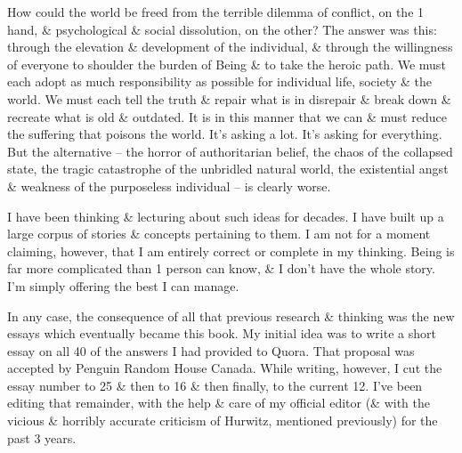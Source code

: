 \documentclass[oneside]{book}
\numberwithin{equation}{section}
\begin{document}
How could the world be freed from the terrible dilemma of conflict, on the 1 hand, \& psychological \& social dissolution, on the other? The answer was this: through the elevation \& development of the individual, \& through the willingness of everyone to shoulder the burden of Being \& to take the heroic path. We must each adopt as much responsibility as possible for individual life, society \& the world. We must each tell the truth \& repair what is in disrepair \& break down \& recreate what is old \& outdated. It is in this manner that we can \& must reduce the suffering that poisons the world. It's asking a lot. It's asking for everything. But the alternative -- the horror of authoritarian belief, the chaos of the collapsed state, the tragic catastrophe of the unbridled natural world, the existential angst \& weakness of the purposeless individual -- is clearly worse.

I have been thinking \& lecturing about such ideas for decades. I have built up a large corpus of stories \& concepts pertaining to them. I am not for a moment claiming, however, that I am entirely correct or complete in my thinking. Being is far more complicated than 1 person can know, \& I don't have the whole story. I'm simply offering the best I can manage.

In any case, the consequence of all that previous research \& thinking was the new essays which eventually became this book. My initial idea was to write a short essay on all 40 of the answers I had provided to Quora. That proposal was accepted by Penguin Random House Canada. While writing, however, I cut the essay number to 25 \& then to 16 \& then finally, to the current 12. I've been editing that remainder, with the help \& care of my official editor (\& with the vicious \& horribly accurate criticism of Hurwitz, mentioned previously) for the past 3 years.
\end{document}
